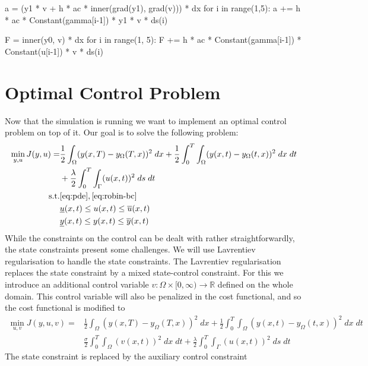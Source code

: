 \documentclass[
12pt, %
a4paper, %
onecolumn, %
portrait %
]{article}
\begin{document}
\begin{python}
a = (y1 * v + h * ac * inner(grad(y1), grad(v))) * dx
for i in range(1,5):
    a += h * ac * Constant(gamma[i-1]) * y1 * v * ds(i)
\end{python}


\begin{python}
F = inner(y0, v) * dx
for i in range(1, 5):
    F += h * ac * Constant(gamma[i-1]) * Constant(u[i-1]) * v * ds(i)
\end{python}

\section{Optimal Control Problem}
Now that the simulation is running we want to implement an optimal control problem on top of it. Our goal is to solve the following problem:
\begin{align*}
\min_{y,u} J(y, u) = & \frac{1}{2}\int_{\Omega} (y(x, T) - y_{\Omega}(T,x))^2 \; dx + \frac{1}{2} \int_{0}^{T} \int_{\Omega} (y(x,t) - y_{\Omega}(t,x))^2 \; dx \; dt \\
& + \frac{\lambda}{2} \int_{0}^{T} \int_{\Gamma} (u(x,t))^2 \; ds \; dt \\
\text{s.t.} & \eqref{eq:pde}, \eqref{eq:robin-bc} \\
& \underline{u}(x,t) \leq u(x,t) \leq \overline{u}(x,t) \\
& \underline{y}(x,t) \leq y(x,t) \leq \overline{y}(x,t)
\end{align*}
While the constraints on the control can be dealt with rather straightforwardly, the state constraints present some challenges. We will use Lavrentiev regularisation to handle the state constraints. The Lavrentiev regularisation replaces the state constraint by a mixed state-control constraint. For this we introduce an additional control variable $v : \Omega \times [0, \infty) \rightarrow \mathbb{R}$ defined on the whole domain. This control variable will also be penalized in the cost functional, and so the cost functional is modified to
\begin{align*}
\min_{u,v} J(y, u, v) = & \frac{1}{2}\int_{\Omega} (y(x, T) - y_{\Omega}(T,x))^2 \; dx + \frac{1}{2} \int_{0}^{T} \int_{\Omega} (y(x,t) - y_{\Omega}(t,x))^2 \; dx \; dt \\
& \frac{\sigma}{2} \int_{0}^{T} \int_{\Omega} (v(x,t))^2 \; dx \; dt 
+ \frac{\lambda}{2} \int_{0}^{T} \int_{\Gamma} (u(x,t))^2 \; ds \; dt
\end{align*}
The state constraint is replaced by the auxiliary control constraint
\end{document}
